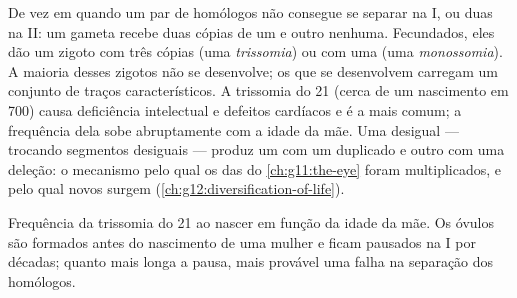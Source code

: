 \begin{proposition}\label{prop:g12:meiosis-genetic-shuffling:errors}
De vez em quando um par de homólogos não consegue se separar na 
I, ou duas  na  II: um gameta recebe duas cópias de um
 e outro nenhuma. Fecundados, eles dão um zigoto com três
cópias (uma \emph{trissomia}) ou com uma (uma \emph{monossomia}). A
maioria desses zigotos não se desenvolve; os que se desenvolvem
carregam um conjunto de traços característicos. A trissomia do 21
(cerca de um nascimento em 700) causa deficiência intelectual e
defeitos cardíacos e é a mais comum; a frequência dela sobe
abruptamente com a idade da mãe. Uma  desigual --- 
trocando segmentos desiguais --- produz um  com um 
duplicado e outro com uma deleção: o mecanismo pelo qual os  das
 do \cref{ch:g11:the-eye} foram multiplicados, e pelo qual 
novos surgem (\cref{ch:g12:diversification-of-life}).
\end{proposition}
\admitted

\begin{omfigure}

{\small Frequência da trissomia do 21 ao nascer em função da idade da
mãe. Os óvulos são formados antes do nascimento de uma mulher e ficam
pausados na  I por décadas; quanto mais longa a pausa, mais
provável uma falha na separação dos homólogos.}
\end{omfigure}

